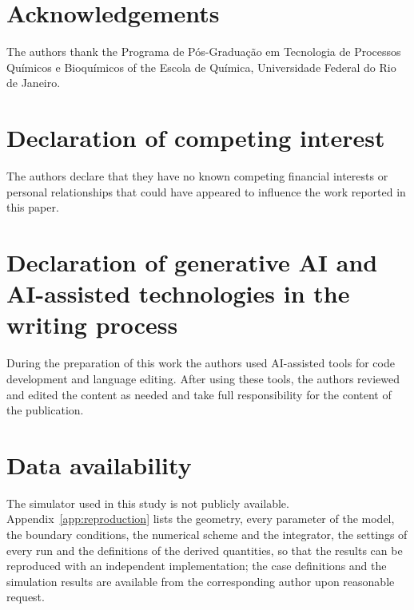 \documentclass[a4paper,fleqn]{cas-sc}
\begin{document}
\section*{Acknowledgements}
The authors thank the Programa de P\'os-Gradua\c{c}\~ao em Tecnologia de Processos Qu\'imicos e Bioqu\'imicos of the Escola de Qu\'imica, Universidade Federal do Rio de Janeiro.

\section*{Declaration of competing interest}
The authors declare that they have no known competing financial interests or personal relationships that could have appeared to influence the work reported in this paper.

\section*{Declaration of generative AI and AI-assisted technologies in the writing process}
During the preparation of this work the authors used AI-assisted tools for code development and language editing. After using these tools, the authors reviewed and edited the content as needed and take full responsibility for the content of the publication.

\section*{Data availability}
The simulator used in this study is not publicly available. Appendix~\ref{app:reproduction} lists the geometry, every parameter of the model, the boundary conditions, the numerical scheme and the integrator, the settings of every run and the definitions of the derived quantities, so that the results can be reproduced with an independent implementation; the case definitions and the simulation results are available from the corresponding author upon reasonable request.

\FloatBarrier
\appendix
\setcounter{equation}{0}
\setcounter{table}{0}
\setcounter{figure}{0}
\end{document}
